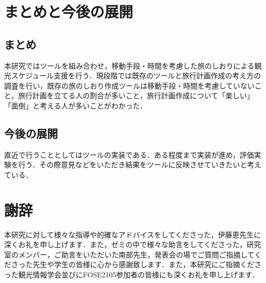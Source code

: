 \documentclass{funthesis}
\begin{document}
\chapter{まとめと今後の展開}%

\section{まとめ}

本研究ではツールを組み合わせ，移動手段・時間を考慮した旅のしおりによる観光スケジュール支援を行う．現段階では既存のツールと旅行計画作成の考え方の調査を行い，既存の旅のしおり作成ツールは移動手段・時間を考慮していないこと，旅行計画を立てる人の割合が多いこと，旅行計画作成について「楽しい」「面倒」と考える人が多いことがわかった．\\



\section{今後の展開}
直近で行うこととしてはツールの実装である．ある程度まで実装が進め，評価実験を行う．その際意見などをいただき結果をツールに反映させていきたいと考えている．



\chapter*{謝辞}
本研究に対して様々な指導や的確なアドバイスをしてくださった，伊藤恵先生に深くお礼を申し上げます．また，ゼミの中で様々な助言をしてくださった，研究室のメンバー，ご助言をいただいた南部先生，発表会の場でご質問ご指摘してくださった先生や学生の皆様に心から感謝致します．また，本研究にご指摘くださった観光情報学会並びにFOSE2105参加者の皆様にも深くお礼を申し上げます．
\end{document}
